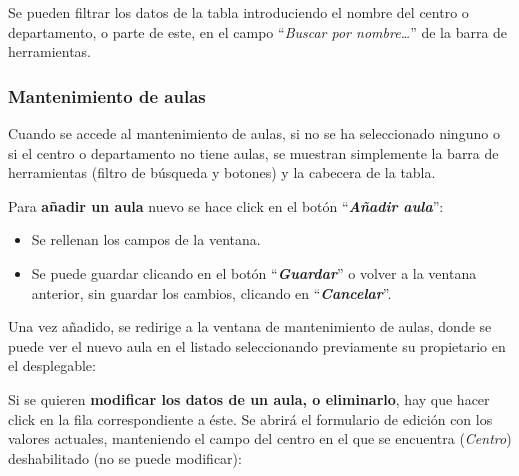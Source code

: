 
Se pueden filtrar los datos de la tabla introduciendo el nombre del centro o departamento, o parte de este, en el campo ``\textit{Buscar por nombre\dots}'' de la barra de herramientas.


\subsubsection{Mantenimiento de aulas}
Cuando se accede al mantenimiento de aulas, si no se ha seleccionado ninguno o si el centro o departamento no tiene aulas, se muestran simplemente la barra de herramientas (filtro de búsqueda y botones) y la cabecera de la tabla.


Para \textbf{añadir un aula} nuevo se hace click en el botón ``\textbf{\textit{Añadir aula}}'':
\begin{itemize}
    \item Se rellenan los campos de la ventana.
    \item Se puede guardar clicando en el botón ``\textbf{\textit{Guardar}}'' o volver a la ventana anterior, sin guardar los cambios, clicando en ``\textbf{\textit{Cancelar}}''.
\end{itemize}


Una vez añadido, se redirige a la ventana de mantenimiento de aulas, donde se puede ver el nuevo aula en el listado seleccionando previamente su propietario en el desplegable:


Si se quieren \textbf{modificar los datos de un aula, o eliminarlo}, hay que hacer click en la fila correspondiente a éste. Se abrirá el formulario de edición con los valores actuales, manteniendo el campo del centro en el que se encuentra (\textit{Centro}) deshabilitado (no se puede modificar):


